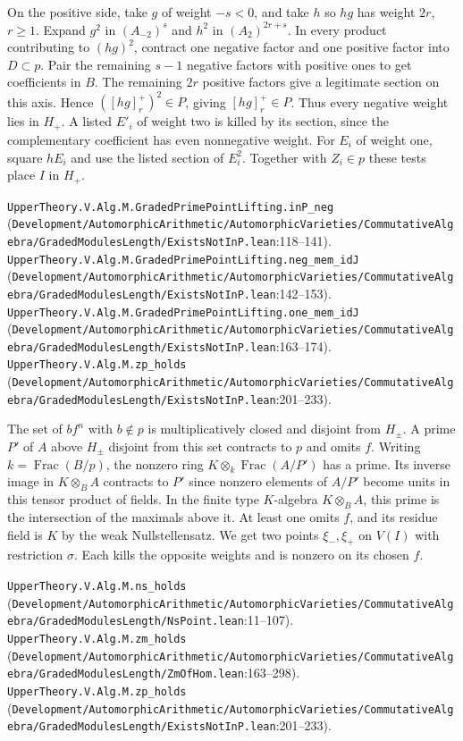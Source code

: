 On the positive side, take $g$ of weight $-s<0$, and take $h$ so $hg$ has
weight $2r$, $r\ge1$. Expand $g^2$ in $(A_{-2})^s$ and $h^2$ in
$(A_2)^{2r+s}$. In every product contributing to $(hg)^2$, contract one
negative factor and one positive factor into $D\subset p$. Pair the remaining
$s-1$ negative factors with positive ones to get coefficients in $B$.
The remaining $2r$ positive factors give a legitimate section on this axis.
Hence $([hg]^+_r)^2\in P$, giving $[hg]^+_r\in P$. Thus every negative
weight lies in $H_+$. A listed $E'_i$ of weight two is killed by its section,
since the complementary coefficient has even nonnegative weight. For $E_i$ of
weight one, square $hE_i$ and use the listed section of $E_i^2$. Together
with $Z_i\in p$ these tests place $I$ in $H_+$.
\par{\footnotesize \nolinkurl{UpperTheory.V.Alg.M.GradedPrimePointLifting.inP_neg} (\nolinkurl{Development/AutomorphicArithmetic/AutomorphicVarieties/CommutativeAlgebra/GradedModulesLength/ExistsNotInP.lean}\allowbreak:118--141). \nolinkurl{UpperTheory.V.Alg.M.GradedPrimePointLifting.neg_mem_idJ} (\nolinkurl{Development/AutomorphicArithmetic/AutomorphicVarieties/CommutativeAlgebra/GradedModulesLength/ExistsNotInP.lean}\allowbreak:142--153). \nolinkurl{UpperTheory.V.Alg.M.GradedPrimePointLifting.one_mem_idJ} (\nolinkurl{Development/AutomorphicArithmetic/AutomorphicVarieties/CommutativeAlgebra/GradedModulesLength/ExistsNotInP.lean}\allowbreak:163--174). \nolinkurl{UpperTheory.V.Alg.M.zp_holds} (\nolinkurl{Development/AutomorphicArithmetic/AutomorphicVarieties/CommutativeAlgebra/GradedModulesLength/ExistsNotInP.lean}\allowbreak:201--233).\par}

The set of $bf^n$ with $b\notin p$ is multiplicatively closed and disjoint from
$H_\pm$. A prime $P'$ of $A$ above $H_\pm$ disjoint from this set contracts
to $p$ and omits $f$. Writing $k=\operatorname{Frac}(B/p)$, the nonzero
ring $K\otimes_k\operatorname{Frac}(A/P')$ has a prime. Its inverse image
in $K\otimes_B A$ contracts to $P'$ since nonzero elements of $A/P'$ become
units in this tensor product of fields. In the finite type $K$-algebra $K\otimes_B A$,
this prime is the intersection of the maximals above it. At least one omits $f$,
and its residue field is $K$ by the weak Nullstellensatz. We get two points
$\xi_-,\xi_+$ on $V(I)$ with restriction $\sigma$. Each kills the opposite
weights and is nonzero on its chosen $f$.
\par{\footnotesize \nolinkurl{UpperTheory.V.Alg.M.ns_holds} (\nolinkurl{Development/AutomorphicArithmetic/AutomorphicVarieties/CommutativeAlgebra/GradedModulesLength/NsPoint.lean}\allowbreak:11--107). \nolinkurl{UpperTheory.V.Alg.M.zm_holds} (\nolinkurl{Development/AutomorphicArithmetic/AutomorphicVarieties/CommutativeAlgebra/GradedModulesLength/ZmOfHom.lean}\allowbreak:163--298). \nolinkurl{UpperTheory.V.Alg.M.zp_holds} (\nolinkurl{Development/AutomorphicArithmetic/AutomorphicVarieties/CommutativeAlgebra/GradedModulesLength/ExistsNotInP.lean}\allowbreak:201--233).\par}

